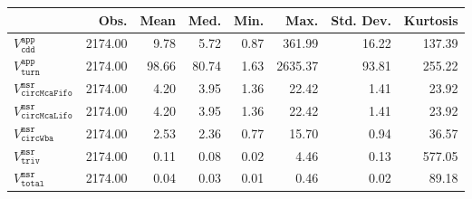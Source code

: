 \begin{tabular}{lrrrrrrr}
  \hline
 & Obs. & Mean & Med. & Min. & Max. & Std. Dev. & Kurtosis \\ 
  \hline
$V^{\mathtt{app}}_{\mathtt{cdd}}$ & 2174.00 & 9.78 & 5.72 & 0.87 & 361.99 & 16.22 & 137.39 \\ 
  $V^{\mathtt{app}}_{\mathtt{turn}}$ & 2174.00 & 98.66 & 80.74 & 1.63 & 2635.37 & 93.81 & 255.22 \\ 
  $V^{\mathtt{msr}}_{\mathtt{circMcaFifo}}$ & 2174.00 & 4.20 & 3.95 & 1.36 & 22.42 & 1.41 & 23.92 \\ 
  $V^{\mathtt{msr}}_{\mathtt{circMcaLifo}}$ & 2174.00 & 4.20 & 3.95 & 1.36 & 22.42 & 1.41 & 23.92 \\ 
  $V^{\mathtt{msr}}_{\mathtt{circWba}}$ & 2174.00 & 2.53 & 2.36 & 0.77 & 15.70 & 0.94 & 36.57 \\ 
  $V^{\mathtt{msr}}_{\mathtt{triv}}$ & 2174.00 & 0.11 & 0.08 & 0.02 & 4.46 & 0.13 & 577.05 \\ 
  $V^{\mathtt{msr}}_{\mathtt{total}}$ & 2174.00 & 0.04 & 0.03 & 0.01 & 0.46 & 0.02 & 89.18 \\ 
   \hline
\end{tabular}

